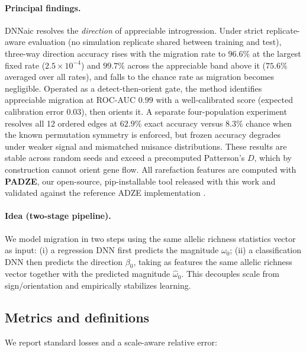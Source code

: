\documentclass[11pt]{article}
\theoremstyle{plain}
\theoremstyle{definition}
\theoremstyle{remark}
\begin{document}
\paragraph{Principal findings.} DNNaic resolves the \emph{direction} of appreciable introgression. Under strict replicate-aware evaluation (no simulation replicate shared between training and test), three-way direction accuracy rises with the migration rate to $96.6\%$ at the largest fixed rate ($2.5\times10^{-4}$) and $99.7\%$ across the appreciable band above it ($75.6\%$ averaged over all rates), and falls to the chance rate as migration becomes negligible. Operated as a detect-then-orient gate, the method identifies appreciable migration at ROC-AUC $0.99$ with a well-calibrated score (expected calibration error $0.03$), then orients it. A separate four-population experiment resolves all 12 ordered edges at $62.9\%$ exact accuracy versus $8.3\%$ chance when the known permutation symmetry is enforced, but frozen accuracy degrades under weaker signal and mismatched nuisance distributions. These results are stable across random seeds and exceed a precomputed Patterson's $D$, which by construction cannot orient gene flow. All rarefaction features are computed with \textbf{PADZE}, our open-source, pip-installable tool released with this work and validated against the reference ADZE implementation \citep{szpiech2008adze}.

\paragraph{Idea (two-stage pipeline).}
We model migration in two steps using the same allelic richness statistics vector as input: (i) a regression DNN first predicts the magnitude $\omega_0$; (ii) a classification DNN then predicts the direction $\beta_0$, taking as features the same allelic richness vector together with the predicted magnitude $\widehat{\omega}_0$. This decouples scale from sign/orientation and empirically stabilizes learning.

\subsection{Metrics and definitions}
\label{subsec:metrics}
We report standard losses and a scale-aware relative error:
\end{document}
